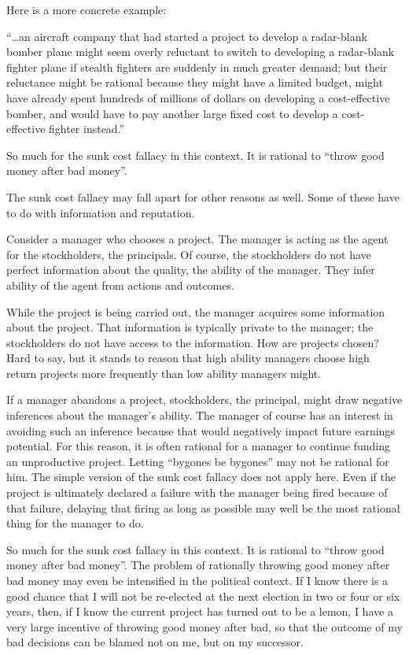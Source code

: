 \documentclass[
]{book}
\begin{document}
Here is a more concrete example:

\begin{center}
``\ldots an aircraft company that had started a project to develop a radar-blank bomber plane might seem overly reluctant to switch to developing a radar-blank fighter plane if stealth fighters are suddenly in much greater demand; but their reluctance might be rational because they might have a limited budget, might have already spent hundreds of millions of dollars on developing a cost-effective bomber, and would have to pay another large fixed cost to develop a cost-effective fighter instead.''

\end{center}

So much for the sunk cost fallacy in this context. It is rational to ``throw good money after bad money''.

The sunk cost fallacy may fall apart for other reasons as well. Some of these have to do with information and reputation.

Consider a manager who chooses a project. The manager is acting as the agent for the stockholders, the principals. Of course, the stockholders do not have perfect information about the quality, the ability of the manager. They infer ability of the agent from actions and outcomes.

While the project is being carried out, the manager acquires some information about the project. That information is typically private to the manager; the stockholders do not have access to the information. How are projects chosen? Hard to say, but it stands to reason that high ability managers choose high return projects more frequently than low ability managers might.

If a manager abandons a project, stockholders, the principal, might draw negative inferences about the manager's ability. The manager of course has an interest in avoiding such an inference because that would negatively impact future earnings potential. For this reason, it is often rational for a manager to continue funding an unproductive project. Letting ``bygones be bygones'' may not be rational for him. The simple version of the sunk cost fallacy does not apply here. Even if the project is ultimately declared a failure with the manager being fired because of that failure, delaying that firing as long as possible may well be the most rational thing for the manager to do.

So much for the sunk cost fallacy in this context. It is rational to ``throw good money after bad money''.
The problem of rationally throwing good money after bad money may even be intensified in the political context. If I know there is a good chance that I will not be re-elected at the next election in two or four or six years, then, if I know the current project has turned out to be a lemon, I have a very large incentive of throwing good money after bad, so that the outcome of my bad decisions can be blamed not on me, but on my successor.
\end{document}
